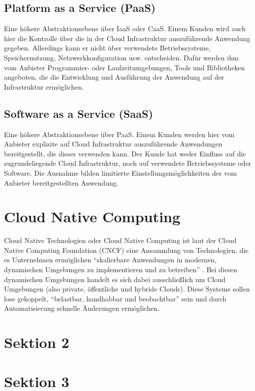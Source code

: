 \subsection{Platform as a Service (PaaS)}
Eine höhere Abstraktionsebene über IaaS oder CaaS. Einem Kunden wird auch hier die Kontrolle über die in der Cloud Infrastruktur auszuführende Anwendung gegeben. Allerdings kann er nicht über verwendete Betriebssysteme, Speichernutzung, Netzwerkkonfiguration usw. entscheiden. Dafür werden ihm vom Anbieter Programmier- oder Laufzeitumgebungen, Tools und Bibliotheken angeboten, die die Entwicklung und Ausführung der Anwendung auf der Infrastruktur ermöglichen\cite{mell_nist_2011}.\\

\subsection{Software as a Service (SaaS)}
Eine höhere Abstraktionsebene über PaaS. Einem Kunden werden hier vom Anbieter explizite auf Cloud Infrastruktur auszuführende Anwendungen bereitgestellt, die dieser verwenden kann. Der Kunde hat weder Einfluss auf die zugrundeliegende Cloud Infrastruktur, noch auf verwendete Betriebssysteme oder Software. Die Ausnahme bilden limitierte Einstellungsmöglichkeiten der vom Anbieter bereitgestellten Anwendung\cite{mell_nist_2011}.

\section{Cloud Native Computing}
Cloud Native Technologien oder Cloud Native Computing ist laut der Cloud Native Computing Foundation (CNCF) eine Ansammlung von Technologien, die es Unternehmen ermöglichen "`skalierbare Anwendungen in modernen, dynamischen Umgebungen zu implementieren und zu betreiben"' \cite{noauthor_cncftoc_nodate}. Bei diesen dynamischen Umgebungen handelt es sich dabei ausschließlich um Cloud Umgebungen (also private, öffentliche und hybride Clouds). Diese Systeme sollen lose gekoppelt, "`belastbar, handhabbar und beobachtbar"' sein und durch Automatisierung schnelle Änderungen ermöglichen\cite{noauthor_cncftoc_nodate}.

\section{Sektion 2}

\section{Sektion 3}